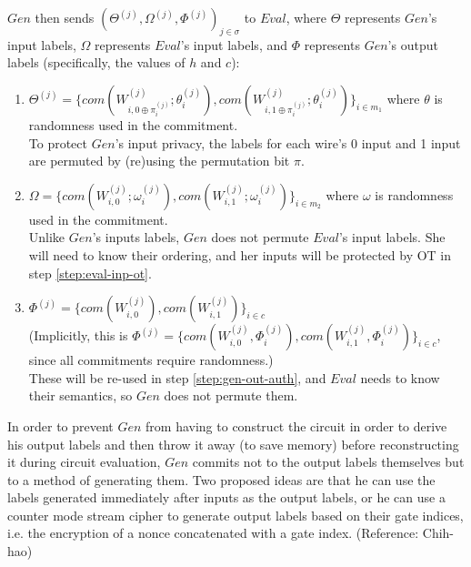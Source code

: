 \documentclass{article}
\begin{document}
\begin{enumerate}
	$Gen$ then sends $(\Theta^{(j)}, \Omega^{(j)}, \Phi^{(j)})_{j \in \sigma}$ to $Eval$, where $\Theta$ represents $Gen$'s input labels, $\Omega$ represents $Eval$'s input labels, and $\Phi$ represents $Gen$'s output labels (specifically, the values of $h$ and $c$):
	\begin{enumerate}[label=(\alph*)]
		\item $\Theta^{(j)}  = \{com(W_{i,0\oplus\pi_{i}^{(j)}}^{(j)};\theta_{i}^{(j)}),com(W_{i,1\oplus\pi_{i}^{(j)}}^{(j)};\theta_{i}^{(j)})\}_{i \in m_{1}}$ where $\theta$ is randomness used in the commitment.\\
		To protect $Gen$'s input privacy, the labels for each wire's 0 input and 1 input are permuted by (re)using the permutation bit $\pi$.
		\item $\Omega = \{com(W_{i,0}^{(j)};\omega_{i}^{(j)}),com(W_{i,1}^{(j)};\omega_{i}^{(j)})\}_{i \in m_{2}}$ where $\omega$ is randomness used in the commitment.\\
		Unlike $Gen$'s inputs labels, $Gen$ does not permute $Eval$'s input labels. She will need to know their ordering, and her inputs will be protected by OT in step \ref{step:eval-inp-ot}.
		\item $\Phi^{(j)} =  \{com(W_{i,0}^{(j)}),com(W_{i,1}^{(j)})\}_{i \in c}$\\ (Implicitly, this is $\Phi^{(j)} =  \{com(W_{i,0}^{(j)},\Phi_{i}^{(j)}),com(W_{i,1}^{(j)},\Phi_{i}^{(j)})\}_{i \in c}$, since all commitments require randomness.) \\
		These will be re-used in step \ref{step:gen-out-auth}, and $Eval$ needs to know their semantics, so $Gen$ does not permute them.
	\end{enumerate}
	
	In order to prevent $Gen$ from having to construct the circuit in order to derive his output labels and then throw it away (to save memory) before reconstructing it during circuit evaluation, $Gen$ commits not to the output labels themselves but to a method of generating them. Two proposed ideas are that he can use the labels generated immediately after inputs as the output labels, or he can use a counter mode stream cipher to generate output labels based on their gate indices, i.e. the encryption of a nonce concatenated with a gate index. (Reference: Chih-hao)\\
	

\end{enumerate}
\end{document}
